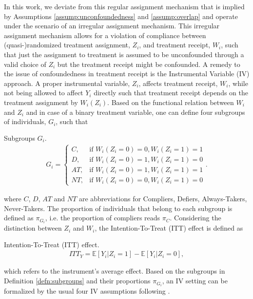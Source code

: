 In this work, we deviate from this regular assignment mechanism that is implied by Assumptions \ref{assump:unconfoundedness} and \ref{assump:overlap} and operate under the scenario of an irregular assignment mechanism.
This irregular assignment mechanism allows for a violation of compliance between (quasi-)randomized treatment assignment, $Z_i$, and treatment receipt, $W_i$, such that just the assignment to treatment is assumed to be unconfounded through a valid choice of $Z_i$ but the treatment receipt might be confounded.
A remedy to the issue of confoundedness in treatment receipt is the Instrumental Variable (IV) approach.
A proper instrumental variable, $Z_i$, affects treatment receipt, $W_i$, while not being allowed to affect $Y_i$ directly such that treatment receipt depends on the treatment assignment by $W_i(Z_i)$.
Based on the functional relation between $W_i$ and $Z_i$ and in case of a binary treatment variable, one can define four subgroups of individuals, $G_i$, such that  
\begin{defn}{Subgroups $G_i$.}
   \label{defn:subgroups}
   \begin{align*}
      G_i=
      \begin{cases}
         C,& \text{if } W_i(Z_i = 0) = 0, W_i(Z_i = 1) = 1 \\
         D,& \text{if } W_i(Z_i = 0) = 1, W_i(Z_i = 1) = 0 \\
         AT,& \text{if } W_i(Z_i = 0) = 1, W_i(Z_i = 1) = 1 \\
         NT,& \text{if }W_i(Z_i = 0) = 0, W_i(Z_i = 1) = 0
      \end{cases}.
   \end{align*}
\end{defn}
where $C$, $D$, $AT$ and $NT$ are abbreviations for Compliers, Defiers, Always-Takers, Never-Takers. 
The proportion of individuals that belong to each subgroup is defined as $\pi_{G_i}$, i.e. the proportion of compliers reads $\pi_{C}$.
Considering the distinction between $Z_i$ and $W_i$, the Intention-To-Treat (ITT) effect is defined as
\begin{defn}{Intention-To-Treat (ITT) effect.}
   \begin{align*}
      ITT_Y = \mathbb{E} \left[ Y_i | Z_i = 1 \right] - \mathbb{E} \left[ Y_i | Z_i = 0 \right],
   \end{align*}
\end{defn}
which refers to the instrument's average effect. 
Based on the subgroups in Definition \ref{defn:subgroups} and their proportions $\pi_{G_i}$, an IV setting can be formalized by the usual four IV assumptions following \cite{Angrist1996}.

